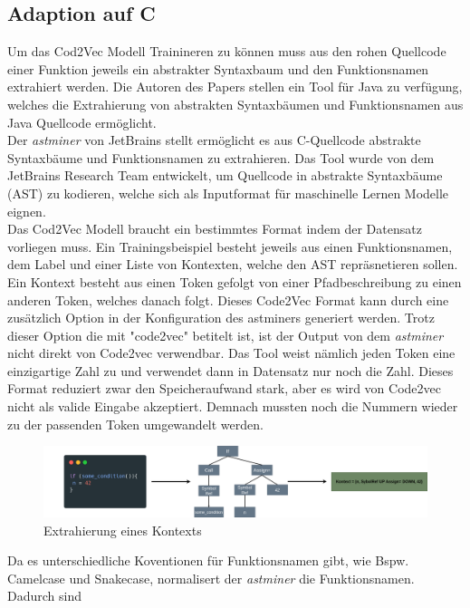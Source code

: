 \documentclass[12pt,letterpaper,ngerman]{article}
\begin{document}
\subsection{Adaption auf C}
Um das Cod2Vec Modell Trainineren zu können muss aus den rohen Quellcode einer
Funktion jeweils ein abstrakter Syntaxbaum und den Funktionsnamen extrahiert 
werden. Die Autoren des Papers stellen ein Tool für Java zu verfügung, welches
die Extrahierung von abstrakten Syntaxbäumen und Funktionsnamen aus Java Quellcode
ermöglicht.\\
Der \textit{astminer} von JetBrains stellt ermöglicht es aus C-Quellcode 
abstrakte Syntaxbäume und Funktionsnamen zu extrahieren. Das
Tool wurde von dem JetBrains Research Team entwickelt, 
um Quellcode in abstrakte Syntaxbäume (AST) zu kodieren, 
welche sich als Inputformat für maschinelle Lernen Modelle eignen. \\
Das Cod2Vec Modell braucht ein bestimmtes Format indem der Datensatz vorliegen
muss. Ein Trainingsbeispiel besteht jeweils aus einen Funktionsnamen, dem
Label und einer Liste von Kontexten, welche
den AST repräsnetieren sollen. Ein Kontext besteht aus einen Token gefolgt von
einer Pfadbeschreibung zu einen anderen Token, welches danach folgt.
Dieses Code2Vec Format kann durch eine zusätzlich Option in der Konfiguration
des astminers generiert werden. Trotz dieser Option die mit "code2vec" betitelt
ist, ist der Output von dem \textit{astminer} nicht direkt von Code2vec
verwendbar. Das Tool weist nämlich jeden Token eine einzigartige Zahl zu und
verwendet dann in Datensatz nur noch die Zahl. Dieses Format reduziert zwar
den Speicheraufwand stark, aber es wird von Code2vec nicht als valide Eingabe
akzeptiert. Demnach mussten noch die Nummern wieder zu der passenden Token
umgewandelt werden.
\begin{figure}[H]
  \begin{center}
    \includegraphics[scale=0.2]{abb/ast-extraction-example.drawio.png}
  \end{center}
  \caption{Extrahierung eines Kontexts}
\end{figure}
Da es unterschiedliche Koventionen für Funktionsnamen gibt, wie Bspw. Camelcase und
Snakecase, normalisert der \textit{astminer} die Funktionsnamen. Dadurch sind
\end{document}
